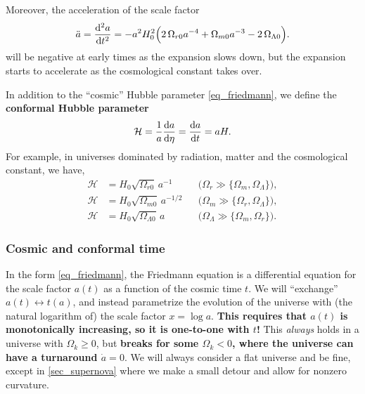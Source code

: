 \documentclass[10pt,a4paper]{article}
\begin{document}
Moreover, the acceleration of the scale factor
\begin{equation}
	\ddot{a} = \odv[2]{a}{t} = -a^2 H_0^2 \Big( 2 \, \Omega_{r0} a^{-4} + \Omega_{m0} a^{-3} - 2 \, \Omega_{\Lambda0} \Big).
\label{eq_acceleration}
\end{equation}
will be negative at early times as the expansion slows down,
but the expansion starts to accelerate as the cosmological constant takes over.

In addition to the ``cosmic'' Hubble parameter \eqref{eq_friedmann},
we define the \textbf{conformal Hubble parameter}
\begin{equation}
	\mathcal{H} = \frac1a \odv{a}{\eta} = \odv{a}{t} = a H.
\label{eq_conformal_hubble}
\end{equation}
For example, in universes dominated by radiation, matter and the cosmological constant,
we have,
\begin{subequations}
\begin{align}
	\mathcal{H} &= H_0 \sqrt{\Omega_{r0}} \, a^{-1} && \Big( \Omega_r \gg \{\Omega_m,\Omega_\Lambda\} \Big), \label{eq_conformal_hubble_dominated_radiation} \\
	\mathcal{H} &= H_0 \sqrt{\Omega_{m0}} \, a^{-1/2} && \Big( \Omega_m \gg \{\Omega_r,\Omega_\Lambda\} \Big), \\
	\mathcal{H} &= H_0 \sqrt{\Omega_{\Lambda0}} \, a && \Big( \Omega_\Lambda \gg \{\Omega_m,\Omega_r\} \Big).
\end{align}
\label{eq_conformal_hubble_dominated}
\end{subequations}

\subsubsection{Cosmic and conformal time}

In the form \eqref{eq_friedmann},
the Friedmann equation is a differential equation for the scale factor $a(t)$
as a function of the cosmic time $t$.
We will ``exchange'' $a(t) \leftrightarrow t(a)$, and instead parametrize the evolution of the universe with (the natural logarithm of) the scale factor $x = \log a$.
\textbf{This requires that $a(t)$ is monotonically increasing, so it is one-to-one with $t$!}
This \emph{always} holds in a universe with $\Omega_{k} \geq 0$,
but \textbf{breaks for some $\Omega_{k} < 0$, where the universe can have a turnaround $\dot{a} = 0$}.
We will always consider a flat universe and be fine,
except in \cref{sec_supernova} where we make a small detour and allow for nonzero curvature.
\end{document}
